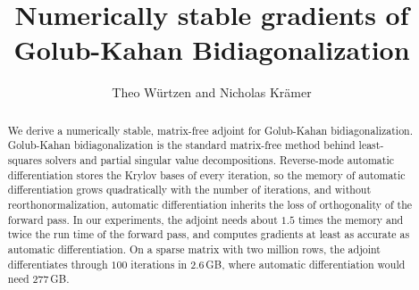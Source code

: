\documentclass[a4paper,12pt]{article}
\theoremstyle{definition}
\begin{document}
\title{Numerically stable gradients of Golub-Kahan Bidiagonalization}
\author{Theo Würtzen and Nicholas Krämer}
\maketitle

\begin{abstract}
We derive a numerically stable, matrix-free adjoint for Golub-Kahan bidiagonalization. Golub-Kahan bidiagonalization is the standard matrix-free method behind least-squares solvers and partial singular value decompositions. Reverse-mode automatic differentiation stores the Krylov bases of every iteration, so the memory of automatic differentiation grows quadratically with the number of iterations, and without reorthonormalization, automatic differentiation inherits the loss of orthogonality of the forward pass. In our experiments, the adjoint needs about $1.5$ times the memory and twice the run time of the forward pass, and computes gradients at least as accurate as automatic differentiation. On a sparse matrix with two million rows, the adjoint differentiates through $100$ iterations in $2.6$\,GB, where automatic differentiation would need $277$\,GB.
\end{abstract}
\end{document}
